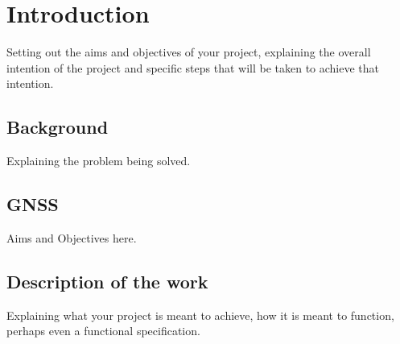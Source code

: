 \chapter{Introduction}

Setting out the aims and objectives of your project, explaining the overall intention of the project and specific steps that will be taken to achieve that intention.

\section{Background}

Explaining the problem being solved.


\section{GNSS}

Aims and Objectives here.


\section{Description of the work}

Explaining what your project is meant to achieve, how it is meant to function, perhaps even a functional specification.


